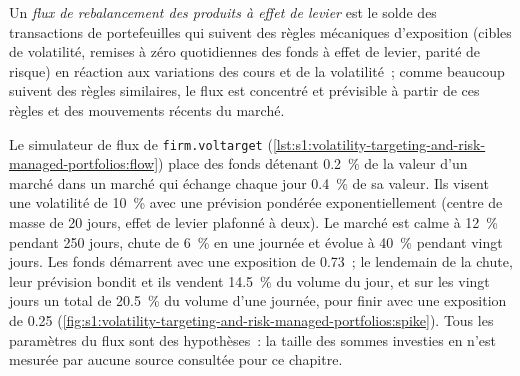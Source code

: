 \begin{definition}\label{def:s1:volatility-targeting-and-risk-managed-portfolios:flow}
Un \emph{flux de rebalancement des produits à effet de levier} est le solde des transactions de portefeuilles qui suivent des règles mécaniques d'exposition
(cibles de volatilité, remises à zéro quotidiennes des fonds à effet de levier, parité de risque) en réaction aux variations des cours et de la volatilité~; comme beaucoup suivent des règles similaires, le
flux est concentré et prévisible à partir de ces règles et des mouvements récents du marché.
\end{definition}

Le simulateur de flux de \texttt{firm.voltarget} (\cref{lst:s1:volatility-targeting-and-risk-managed-portfolios:flow}) place des fonds détenant 0.2~\% de la valeur d'un marché
dans un marché qui échange chaque jour 0.4~\% de sa valeur. Ils visent une volatilité de 10~\% avec une prévision pondérée exponentiellement (centre de masse de 20 jours,
effet de levier plafonné à deux). Le marché est calme à 12~\% pendant 250 jours, chute de 6~\% en une journée et évolue à 40~\% pendant vingt jours. Les fonds démarrent avec une exposition
de 0.73~; le lendemain de la chute, leur prévision bondit et ils vendent 14.5~\% du volume du jour, et sur les vingt jours un total de 20.5~\% du volume d'une journée,
pour finir avec une exposition de 0.25 (\cref{fig:s1:volatility-targeting-and-risk-managed-portfolios:spike}). Tous les paramètres du flux sont des hypothèses~:
la taille des sommes investies en  n'est mesurée par aucune source consultée pour ce chapitre.

